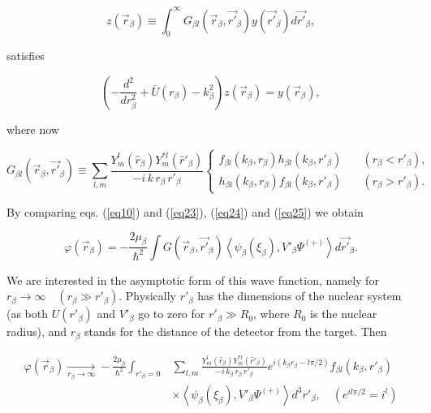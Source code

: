  \begin{equation}\label{eq23}
z(\vec r_ \beta) \equiv \int _0^\infty G_{\beta l} (\vec r_ \beta,\vec {r'}_ \beta) y(\vec {r'}_ \beta) d\vec {r'}_ \beta,
\end{equation}


satisfies

\begin{equation}\label{eq24}
\left( -\frac{d^2}{dr^2_\beta}+\bar U (r_ \beta)-k_\beta^2\right) z(\vec r_ \beta)= y(\vec r_ \beta),
\end{equation}


where now


 \begin{equation}\label{eq25}
G_{\beta l} (\vec r_ \beta,\vec {r'}_ \beta) \equiv \sum_{l,m} \frac{Y_m^l(\hat r_ \beta)Y_m^{*l}(\hat r'_ \beta)}
{-i\, k \,r_ \beta\, r'_ \beta}
\left \lbrace \begin{aligned}
f_{\beta l}( k_ \beta, r_ \beta) h_{\beta l}( k_ \beta, r'_ \beta) &\quad( r_ \beta< r'_ \beta),\\
h_{\beta l}( k_ \beta, r_ \beta) f_{\beta l}( k_ \beta, r'_ \beta) &\quad( r_ \beta>r'_ \beta).
\end{aligned}
\right.
\end{equation}

By comparing eqs. (\ref{eq10}) and (\ref{eq23}), (\ref{eq24}) and (\ref{eq25}) we obtain

\begin{equation}\label{eq26}
\varphi(\vec r_ \beta)=-\frac{2 \mu_\beta}{\hbar^2} \int G (\vec r_ \beta,\vec {r'}_ \beta)\left\langle
\psi_\beta (\xi_\beta),V'_\beta \Psi^{(+)}\right\rangle  d\vec {r'}_ \beta.
\end{equation}

We are interested in the asymptotic form of this wave function, namely for $r_\beta \longrightarrow \infty \quad (r_\beta \gg r'_\beta)$. Physically $r'_\beta$ has the dimensions of the nuclear system (as both $ U(r'_\beta)$ and $V'_\beta$ go to zero for $r'_\beta \gg R_0$, where $R_0$ is the nuclear radius), and $r_\beta$ stands for the distance of the detector from the target. Then




\begin{equation}\label{eq27}
\begin{split}
\varphi(\vec r_{\beta}) \xrightarrow[r_\beta \rightarrow \infty]{} -\frac{2 \mu_{\beta}}{\hbar^2} \int_{r'_{\beta}=0} &
\sum_{l,m}  \frac{Y_m^l(\hat r_ \beta)Y_m^{*l}(\hat r'_ \beta)}{-i \, k_\beta \, r_ \beta\, r'_ \beta}
e^{i(k_\beta r_ \beta-l\pi/2)}f_{\beta l}(k_\beta, r'_ \beta) \\
& \times \left\langle
\psi_\beta (\xi_\beta),V'_\beta \Psi^{(+)}\right\rangle d^3 r'_ \beta,\quad (e^{i l\pi/2}=i^l)
\end{split}
\end{equation}


